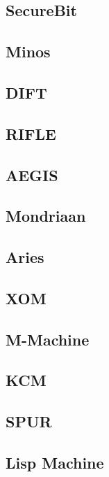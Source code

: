 \subsection{SecureBit}

\subsection{Minos}

\subsection{DIFT}

\subsection{RIFLE}

\subsection{AEGIS}

\subsection{Mondriaan}

\subsection{Aries}

\subsection{XOM}

\subsection{M-Machine}

\subsection{KCM}

\subsection{SPUR}

\subsection{Lisp Machine}

